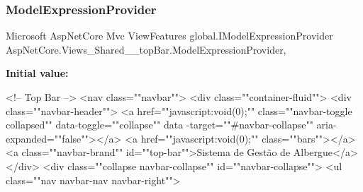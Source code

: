 \subsubsection{\texorpdfstring{Model\+Expression\+Provider}{ModelExpressionProvider}}
{\footnotesize\ttfamily Microsoft Asp\+Net\+Core Mvc View\+Features global.\+I\+Model\+Expression\+Provider Asp\+Net\+Core.\+Views\+\_\+\+Shared\+\_\+\+\_\+top\+Bar.\+Model\+Expression\+Provider\hspace{0.3cm}{\ttfamily [get]}, {}}

{\bfseries Initial value\+:}
\begin{DoxyCode}
<!-- Top Bar -->
<nav \textcolor{keyword}{class}=\textcolor{stringliteral}{""}navbar\textcolor{stringliteral}{""}>
    <div \textcolor{keyword}{class}=\textcolor{stringliteral}{""}container-fluid\textcolor{stringliteral}{""}>
        <div \textcolor{keyword}{class}=\textcolor{stringliteral}{""}navbar-header\textcolor{stringliteral}{""}>
            <a href=\textcolor{stringliteral}{""}javascript:void(0);\textcolor{stringliteral}{""} \textcolor{keyword}{class}=\textcolor{stringliteral}{""}navbar-toggle collapsed\textcolor{stringliteral}{""} data-toggle=\textcolor{stringliteral}{""}collapse\textcolor{stringliteral}{""} data
      -target=\textcolor{stringliteral}{""}#navbar-collapse\textcolor{stringliteral}{""} aria-expanded=\textcolor{stringliteral}{""}\textcolor{keyword}{false}\textcolor{stringliteral}{""}></a>
            <a href=\textcolor{stringliteral}{""}javascript:void(0);\textcolor{stringliteral}{""} \textcolor{keyword}{class}=\textcolor{stringliteral}{""}bars\textcolor{stringliteral}{""}></a>
            <a \textcolor{keyword}{class}=\textcolor{stringliteral}{""}navbar-brand\textcolor{stringliteral}{""} \textcolor{keywordtype}{id}=\textcolor{stringliteral}{""}top-bar\textcolor{stringliteral}{""}>Sistema de Gestão de Albergue</a>
        </div>
        <div \textcolor{keyword}{class}=\textcolor{stringliteral}{""}collapse navbar-collapse\textcolor{stringliteral}{""} \textcolor{keywordtype}{id}=\textcolor{stringliteral}{""}navbar-collapse\textcolor{stringliteral}{""}>
            <ul \textcolor{keyword}{class}=\textcolor{stringliteral}{""}nav navbar-nav navbar-right\textcolor{stringliteral}{""}>
               

\end{DoxyCode}
